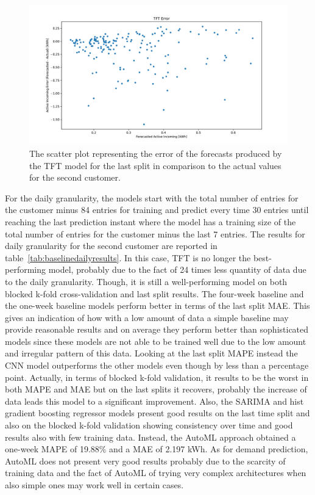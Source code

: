 \begin{figure}[H]
\centering
\includegraphics[width=1\textwidth]{images/baseline/TFT_error_scatter_plot_predicted}
\caption{The scatter plot representing the error of the forecasts produced by the TFT model for the last split in comparison to the actual values for the second customer.}
\label{fig:baselinetfthourlyforecastsscatterplot}
\end{figure}

For the daily granularity, the models start with the total number of entries for the customer minus 84 entries for training and predict every time 30 entries until reaching the last prediction instant where the model has a training size of the total number of entries for the customer minus the last 7 entries.
The results for daily granularity for the second customer are reported in table~\ref{tab:baselinedailyresults}.
In this case, TFT is no longer the best-performing model, probably due to the fact of 24 times less quantity of data due to the daily granularity.
Though, it is still a well-performing model on both blocked k-fold cross-validation and last split results.
The four-week baseline and the one-week baseline models perform better in terms of the last split MAE.
This gives an indication of how with a low amount of data a simple baseline may provide reasonable results and on average they perform better than sophisticated models since these models are not able to be trained well due to the low amount and irregular pattern of this data.
Looking at the last split MAPE instead the CNN model outperforms the other models even though by less than a percentage point.
Actually, in terms of blocked k-fold validation, it results to be the worst in both MAPE and MAE but on the last splits it recovers, probably the increase of data leads this model to a significant improvement.
Also, the SARIMA and hist gradient boosting regressor models present good results on the last time split and also on the blocked k-fold validation showing consistency over time and good results also with few training data.
Instead, the AutoML approach obtained a one-week MAPE of 19.88\% and a MAE of 2.197 kWh.
As for demand prediction, AutoML does not present very good results probably due to the scarcity of training data and the fact of AutoML of trying very complex architectures when also simple ones may work well in certain cases.


